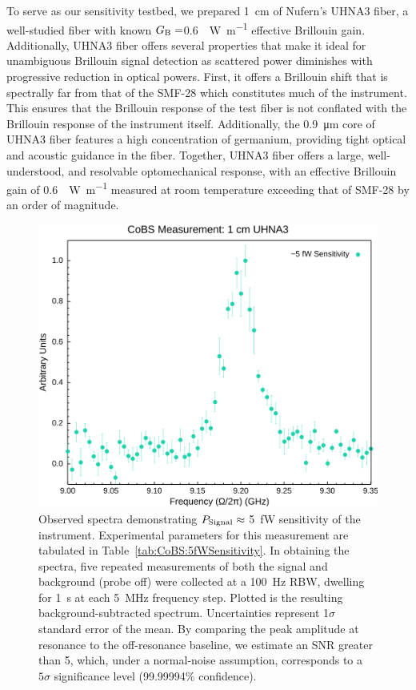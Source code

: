 To serve as our sensitivity testbed, we prepared \SI{1}{\centi\meter} of Nufern's \acl{UHNA3} fiber, a well-studied fiber with known \(G_{\rm B} = \)\SI{0.6}{\per\watt\per\meter} effective Brillouin gain. \cite{behunin2015long} Additionally, \ac{UHNA3} fiber offers several properties that make it ideal for unambiguous Brillouin signal detection as scattered power diminishes with progressive reduction in optical powers. First, it offers a Brillouin shift that is spectrally far from that of the \ac{SMF-28} which constitutes much of the instrument. This ensures that the Brillouin response of the test fiber is not conflated with the Brillouin response of the instrument itself. Additionally, the \SI{0.9}{\micro\meter} core of \ac{UHNA3} fiber features a high concentration of germanium, providing tight optical and acoustic guidance in the fiber. Together, \ac{UHNA3} fiber offers a large, well-understood, and resolvable optomechanical response, with an effective Brillouin gain of \SI{0.6}{\per\watt\per\meter} measured at room temperature exceeding that of \ac{SMF-28} by an order of magnitude. \cite{nikles1997brillouin}

\begin{figure}[t!]
  \centering
  \hspace{-2em}\includegraphics[width=.85\textwidth]{figs/3-CoBS/CoBS Sensitivity Measurement: 1 cm UHNA3 5 fW.png}
  \caption[Observed spectra demonstrating \(P_{\rm Signal}\approx\) \SI{5}{\femto\watt} sensitivity of the instrument.]{Observed spectra demonstrating \(P_{\rm Signal}\approx\) \SI{5}{\femto\watt} sensitivity of the instrument. Experimental parameters for this measurement are tabulated in Table~\ref{tab:CoBS:5fWSensitivity}. In obtaining the spectra, five repeated measurements of both the signal and background (probe off) were collected at a \SI{100}{\hertz} \ac{RBW}, dwelling for \SI{1}{\second} at each \SI{5}{\mega\hertz} frequency step. Plotted is the resulting background-subtracted spectrum. Uncertainties represent 1\(\sigma\) standard error of the mean. By comparing the peak amplitude at resonance to the off-resonance baseline, we estimate an \ac{SNR} greater than 5, which, under a normal-noise assumption, corresponds to a \(5\sigma\) significance level (99.99994\% confidence).}
  \label{fig:CoBS:5fWSensitivity}
\end{figure}

